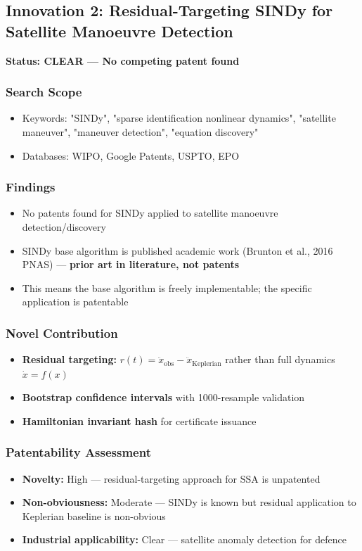 \documentclass[11pt,a4paper]{article}
\begin{document}
\newpage

\subsection{Innovation 2: Residual-Targeting SINDy for Satellite Manoeuvre Detection}

\textbf{Status: \textcolor{attgreen}{CLEAR — No competing patent found}}

\subsubsection*{Search Scope}
\begin{itemize}
\item Keywords: "SINDy", "sparse identification nonlinear dynamics", "satellite maneuver", "maneuver detection", "equation discovery"
\item Databases: WIPO, Google Patents, USPTO, EPO
\end{itemize}

\subsubsection*{Findings}
\begin{itemize}
\item No patents found for SINDy applied to satellite manoeuvre detection/discovery
\item SINDy base algorithm is published academic work (Brunton et al., 2016 PNAS) — \textbf{prior art in literature, not patents}
\item This means the base algorithm is freely implementable; the specific application is patentable
\end{itemize}

\subsubsection*{Novel Contribution}
\begin{itemize}
\item \textbf{Residual targeting:} $r(t) = \ddot{x}_\text{obs} - \ddot{x}_\text{Keplerian}$ rather than full dynamics $\dot{x} = f(x)$
\item \textbf{Bootstrap confidence intervals} with 1000-resample validation
\item \textbf{Hamiltonian invariant hash} for certificate issuance
\end{itemize}

\subsubsection*{Patentability Assessment}
\begin{itemize}
\item \textbf{Novelty:} High — residual-targeting approach for SSA is unpatented
\item \textbf{Non-obviousness:} Moderate — SINDy is known but residual application to Keplerian baseline is non-obvious
\item \textbf{Industrial applicability:} Clear — satellite anomaly detection for defence
\end{itemize}
\end{document}
